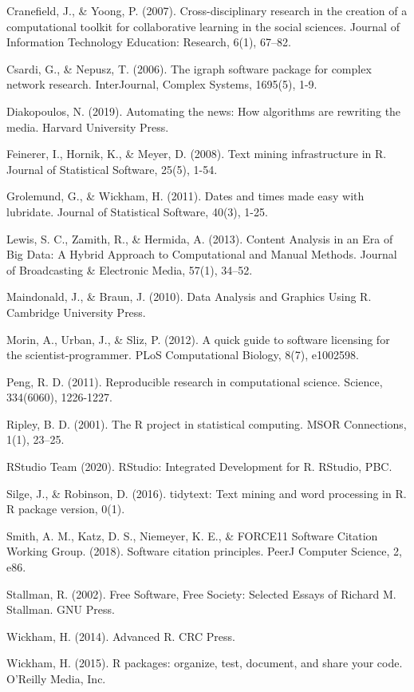 \documentclass[
  b5paper]{book}
\begin{document}
Cranefield, J., \& Yoong, P. (2007). Cross-disciplinary research in the creation of a computational toolkit for collaborative learning in the social sciences. Journal of Information Technology Education: Research, 6(1), 67--82.

Csardi, G., \& Nepusz, T. (2006). The igraph software package for complex network research. InterJournal, Complex Systems, 1695(5), 1-9.

Diakopoulos, N. (2019). Automating the news: How algorithms are rewriting the media. Harvard University Press.

Feinerer, I., Hornik, K., \& Meyer, D. (2008). Text mining infrastructure in R. Journal of Statistical Software, 25(5), 1-54.

Grolemund, G., \& Wickham, H. (2011). Dates and times made easy with lubridate. Journal of Statistical Software, 40(3), 1-25.

Lewis, S. C., Zamith, R., \& Hermida, A. (2013). Content Analysis in an Era of Big Data: A Hybrid Approach to Computational and Manual Methods. Journal of Broadcasting \& Electronic Media, 57(1), 34--52.

Maindonald, J., \& Braun, J. (2010). Data Analysis and Graphics Using R. Cambridge University Press.

Morin, A., Urban, J., \& Sliz, P. (2012). A quick guide to software licensing for the scientist-programmer. PLoS Computational Biology, 8(7), e1002598.

Peng, R. D. (2011). Reproducible research in computational science. Science, 334(6060), 1226-1227.

Ripley, B. D. (2001). The R project in statistical computing. MSOR Connections, 1(1), 23--25.

RStudio Team (2020). RStudio: Integrated Development for R. RStudio, PBC.

Silge, J., \& Robinson, D. (2016). tidytext: Text mining and word processing in R. R package version, 0(1).

Smith, A. M., Katz, D. S., Niemeyer, K. E., \& FORCE11 Software Citation Working Group. (2018). Software citation principles. PeerJ Computer Science, 2, e86.

Stallman, R. (2002). Free Software, Free Society: Selected Essays of Richard M. Stallman. GNU Press.

Wickham, H. (2014). Advanced R. CRC Press.

Wickham, H. (2015). R packages: organize, test, document, and share your code. O'Reilly Media, Inc.
\end{document}
